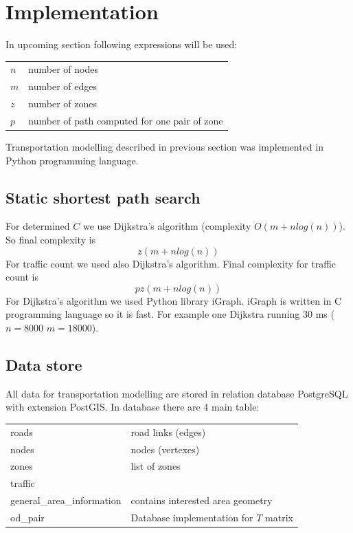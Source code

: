 \section{Implementation}
In upcoming section following expressions will be used:

\begin{tabular}{ll}
$n$ & number of nodes\\
$m$ & number of edges \\
$z$ & number of zones\\
$p$ & number of path computed for one pair of zone
\end{tabular}

Transportation modelling described in previous section was implemented in Python programming language.

\subsection{Static shortest path search}
For determined $C$ we use Dijkstra's algorithm (complexity $O(m +n log(n))$). So final complexity is 
$$z (m + n log(n))$$
For traffic count we used also Dijkstra's algorithm. Final complexity for traffic count is 
$$p z (m + n log(n))$$
For Dijkstra's algorithm we used Python library iGraph. iGraph is written in C programming language so it is fast. For example one Dijkstra running 30 ms ($n = 8000$ $m = 18000$).

\subsection{Data store}
All data for transportation modelling are stored in relation database PostgreSQL with extension PostGIS. In database there are 4 main table:

\begin{tabular}{ll}
roads & road links (edges)\\
nodes & nodes (vertexes)\\
zones & list of zones\\ 
traffic & \\
general\_area\_information & contains interested area geometry\\
od\_pair & Database implementation for $T$ matrix\\
\end{tabular}

